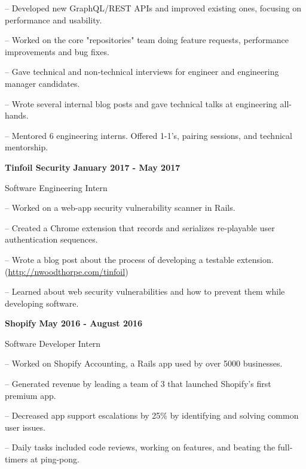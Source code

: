 {{        \begin{compactitem}
            \setlength{\itemindent}{0.5cm}
            \item[--] Developed new GraphQL/REST APIs and improved existing ones, focusing on performance and usability.
            \item[--] Worked on the core "repositories" team doing feature requests, performance improvements and bug fixes.
            \item[--] Gave technical and non-technical interviews for engineer and engineering manager candidates.
            \item[--] Wrote several internal blog posts and gave technical talks at engineering all-hands.
            \item[--] Mentored 6 engineering interns. Offered 1-1's, pairing sessions, and technical mentorship.
        \end{compactitem}
    }

    \vspace{0.3cm}

    {\indent
        \textbf{Tinfoil Security} \hfill \textbf{January 2017 - May 2017}

        Software Engineering Intern

        \begin{compactitem}
            \setlength{\itemindent}{0.5cm}
            \item[--] Worked on a web-app security vulnerability scanner in Rails.
            \item[--]  Created a Chrome extension that records and serializes re-playable user authentication sequences.
            \item[--] Wrote a blog post about the process of developing a testable extension. (\href{http://nwoodthorpe.com/tinfoil}{http://nwoodthorpe.com/tinfoil})
            \item[--] Learned about web security vulnerabilities and how to prevent them while developing software.
        \end{compactitem}
    }

     \vspace{0.3cm}

    {\indent
        \textbf{Shopify} \hfill \textbf{May 2016 - August 2016}

        Software Developer Intern

        \begin{compactitem}
            \setlength{\itemindent}{0.5cm}
            \item[--] Worked on Shopify Accounting, a Rails app used by over 5000 businesses.
            \item[--] Generated revenue by leading a team of 3 that launched Shopify's first premium app.
            \item[--] Decreased app support escalations by 25\% by identifying and solving common user issues.
            \item[--] Daily tasks included code reviews, working on features, and beating the full-timers at ping-pong.
        \end{compactitem}
    }

}
